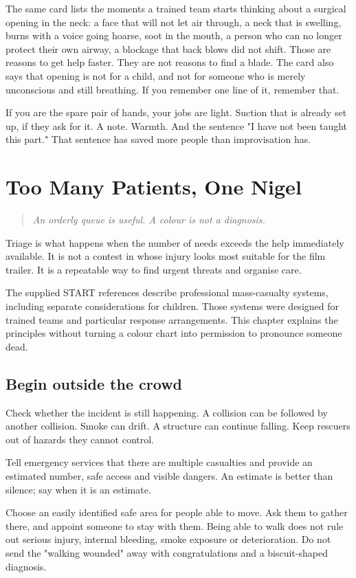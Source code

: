 \documentclass[10pt,openright]{book}
\begin{document}
The same card lists the moments a trained team starts thinking about a surgical opening in the neck: a face that will not let air through, a neck that is swelling, burns with a voice going hoarse, soot in the mouth, a person who can no longer protect their own airway, a blockage that back blows did not shift. Those are reasons to get help faster. They are not reasons to find a blade. The card also says that opening is not for a child, and not for someone who is merely unconscious and still breathing. If you remember one line of it, remember that.

If you are the spare pair of hands, your jobs are light. Suction that is already set up, if they ask for it. A note. Warmth. And the sentence "I have not been taught this part." That sentence has saved more people than improvisation has.

\chapter{Too Many Patients, One Nigel}
\begin{quote}\emph{An orderly queue is useful. A colour is not a diagnosis.}\end{quote}
Triage is what happens when the number of needs exceeds the help immediately available. It is not a contest in whose injury looks most suitable for the film trailer. It is a repeatable way to find urgent threats and organise care.

The supplied START references describe professional mass-casualty systems, including separate considerations for children. Those systems were designed for trained teams and particular response arrangements. This chapter explains the principles without turning a colour chart into permission to pronounce someone dead.

\section*{Begin outside the crowd}
Check whether the incident is still happening. A collision can be followed by another collision. Smoke can drift. A structure can continue falling. Keep rescuers out of hazards they cannot control.

Tell emergency services that there are multiple casualties and provide an estimated number, safe access and visible dangers. An estimate is better than silence; say when it is an estimate.

Choose an easily identified safe area for people able to move. Ask them to gather there, and appoint someone to stay with them. Being able to walk does not rule out serious injury, internal bleeding, smoke exposure or deterioration. Do not send the "walking wounded" away with congratulations and a biscuit-shaped diagnosis.
\end{document}
